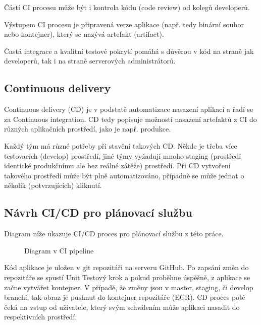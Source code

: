 \documentclass[thesis=M,czech]{FITthesis}[2019/12/23]
\theoremstyle{plain}
\theoremstyle{definition}
\begin{document}
Částí CI procesu může být i kontrola kódu (code review) od kolegů developerů.

Výstupem CI procesu je připravená verze aplikace (např. tedy binární soubor nebo kontejner), který se nazývá artefakt (artifact).


Častá integrace a kvalitní testové pokrytí pomáhá s důvěrou v kód na straně jak developerů, tak i na straně serverových administrátorů. 

\subsection{Continuous delivery}

Continuous delivery (CD) je v podstatě automatizace nasazení aplikací a řadí se za Continuous integration. CD tedy popisuje možností nasazení artefaktů z CI do různých aplikačních prostředí, jako je např. produkce.\cite{humble-ci}

Každý tým má různé potřeby při stavění takových CD. Někde je třeba více testovacích (develop) prostředí, jiné týmy vyžadují mnoho staging (prostředí identické produkčnímu ale bez reálné zátěže) prostředí. Při CD vytvoření takového prostředí může být plně automatizováno, případně se může jednat o několik (potvrzujících) kliknutí.


\subsection{Návrh CI/CD pro plánovací službu}

Diagram níže ukazuje CI/CD proces pro plánovací službu z této práce.



\begin{figure}[H]\centering
	

	\caption[Diagram v CI pipeline]{Diagram v CI pipeline}\label{fig:float}
\end{figure}

Kód aplikace je uložen v git repozitáři na serveru GitHub. Po zapsání změn do repozitáře se spustí Unit Testový krok a pokud proběhne úspěšně, z aplikace se začne vytvářet kontejner. V případě, že změny jsou v master, staging, či develop branchi, tak obraz je pushnut do kontejner repozitáře (ECR). CD proces poté čeká na vstup od uživatele, který svým schválením může aplikaci nasadit do respektivních prostředí.
\end{document}
